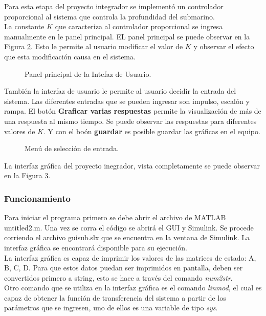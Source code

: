 \documentclass[journal]{IEEEtran}
\begin{document}
Para esta etapa del proyecto integrador se implement\'o un 
controlador proporcional al sistema que controla la 
profundidad del submarino. \\

La constante $K$ que caracteriza al controlador proporcional 
se ingresa manualmente en le panel principal. EL panel 
principal se puede observar en la Figura \ref{panel}. Esto 
le permite al usuario modificar el valor de $K$ y observar 
el efecto que esta modificaci\'on causa en el sistema. \\

\begin{figure}[h]
\label{panel}
\caption{Panel principal de la Intefaz de Usuario.}
\end{figure}

Tambi\'en la interfaz de usuario le permite al usuario 
decidir la entrada del sistema. Las diferentes entradas 
que se pueden ingresar son impulso, escal\'on y rampa. 
El bot\'on \textbf{Graficar varias respuestas} permite 
la visualizaci\'on de m\'as de una respuesta al mismo 
tiempo. Se puede observar las respuestas para diferentes
valores de $K$.
Y con el bo\'on \textbf{guardar} es posible guardar
las gr\'aficas en el equipo.\\

\begin{figure}[h]
\label{panel}
\caption{Men\'u de selecci\'on de entrada.}
\end{figure}

La interfaz gr\'afica del proyecto inegrador, vista 
completamente se puede observar en la Figura \ref{GUI}. \\

\begin{figure}[h]
\label{GUI}
\end{figure}

\subsubsection*{Funcionamiento}
Para iniciar el programa primero se debe abrir el archivo 
de MATLAB untitled2.m. Una vez se corra el código se 
abrirá el GUI y Simulink. Se procede corriendo el 
archivo guisub.slx que se encuentra en la ventana 
de Simulink. La interfaz gráfica se encontrará 
disponible para su ejecución.\\

La interfaz gr\'afica es capaz de imprimir los valores de 
las matrices de estado: A, B, C, D. 
Para que estos datos 
puedan ser imprimidos en pantalla, deben ser convertidos 
primero a string, esto se hace a través del comando 
\textit{num2str}. \\

Otro comando que se utiliza en la interfaz gráfica es el 
comando \textit{linmod}, el cual es capaz de obtener la 
funci\'on de transferencia del sistema a partir de los 
par\'ametros que se ingresen, uno de ellos es una 
variable de tipo \textit{sys}. \\

 
\end{document}
